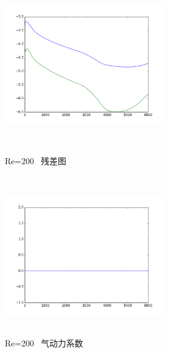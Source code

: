 \documentclass[UTF8]{ctexart}
\begin{document}
\begin{figure}[htbp]
\begin{minipage}{7cm}
\includegraphics[height=7cm,width=7cm]{../pic/Residue_200.png}
\caption{Re=200 \ 残差图}
\end{minipage}
\begin{minipage}{7cm}
\includegraphics[height=7cm,width=7cm]{../pic/Aerodynamics_200.png}
\caption{Re=200 \ 气动力系数}
\end{minipage}
\end{figure}
\clearpage
\end{document}
